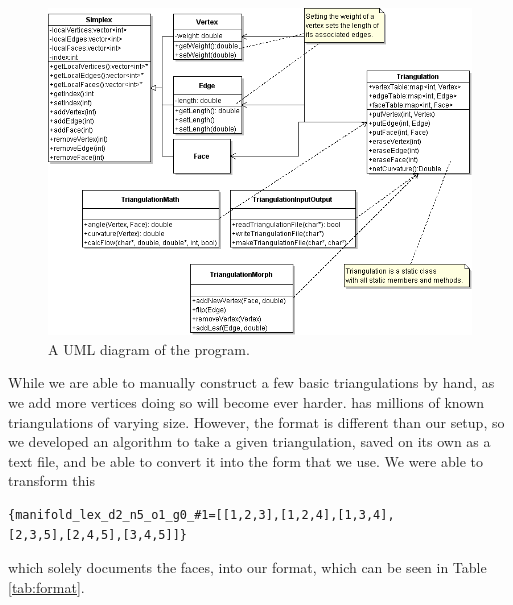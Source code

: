 \documentclass[12pt]{article}
\begin{document}
\begin{figure}
\includegraphics[scale = 0.48]{triangulationUML.png}
\caption{A UML diagram of the program.}
\label{triUML}
\end{figure}

\noindent While we are able to manually construct a few basic triangulations by hand, as we add more vertices doing so will become ever harder. \cite{lutzmanifold} has millions of known triangulations of varying size. However, the format is different than our setup, so we developed an algorithm to take a given triangulation, saved on its own as a text file, and be able to convert it into the form that we use. We were able to transform this
  
\begin{verbatim}{manifold_lex_d2_n5_o1_g0_#1=[[1,2,3],[1,2,4],[1,3,4],
[2,3,5],[2,4,5],[3,4,5]]}
\end{verbatim}
 
\noindent which solely documents the faces, into our format, which can be seen in Table \ref{tab:format}.
\end{document}
